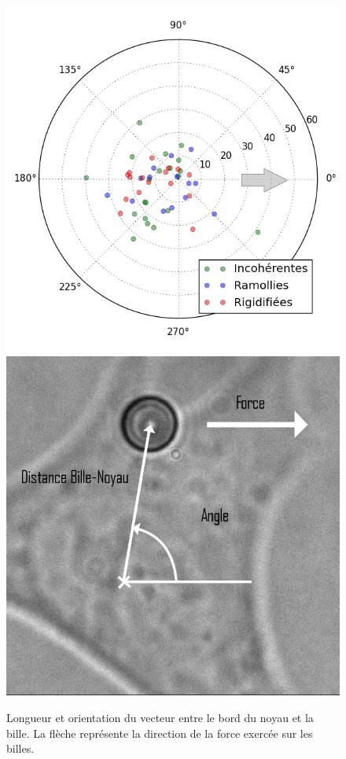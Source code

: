 \documentclass{report}
\begin{document}
\begin{figure}
\includegraphics[scale=0.45]{Figures/Positions_FRI.png} 
\includegraphics[scale=0.2]{Figures/Schema_angle.png}
\caption{Longueur et orientation du vecteur entre le bord du noyau et la bille. La flèche représente la direction de la force exercée sur les billes.\label{polar}}
\end{figure}
\end{document}
